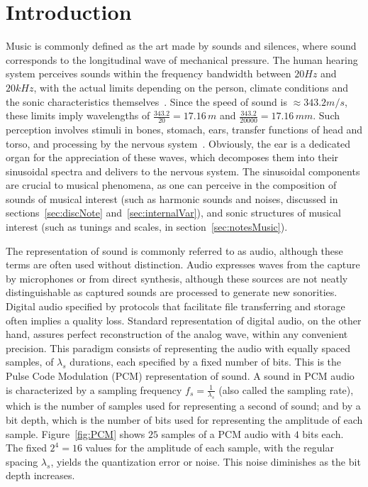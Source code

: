 \section{Introduction}\label{sec:level1}

Music is commonly defined as the art made by sounds and silences, where sound corresponds to the longitudinal wave of mechanical pressure. The human hearing system perceives sounds within the frequency bandwidth between $20Hz$ and $20kHz$, with the actual limits depending on the person, climate conditions and the sonic characteristics themselves~\cite{Roederer}. Since the speed of sound is $\approx 343.2 m/s$, these limits imply wavelengths of $\frac{343.2}{20} = 17.16\,m$ and $\frac{343.2}{20000}=17.16\,mm$. Such perception involves stimuli in bones, stomach, ears, transfer functions of head and torso, and processing by the nervous system~\cite{Roederer}. Obviously, the ear is a dedicated organ for the appreciation of these waves, which decomposes them into their sinusoidal spectra and delivers to the nervous system. The sinusoidal components are crucial to musical phenomena, as one can perceive in the composition of sounds of musical interest (such as harmonic sounds and noises, discussed in sections~\ref{sec:discNote} and~\ref{sec:internalVar}), and sonic structures of musical interest (such as tunings and scales, in section~\ref{sec:notesMusic}). 

The representation of sound is commonly referred to as audio, although these terms are often used without distinction. Audio expresses waves from the capture by microphones or from direct synthesis, although these sources are not neatly distinguishable as captured sounds are processed to generate new sonorities. Digital audio specified by protocols that facilitate file transferring and storage often implies a quality loss. Standard representation of digital audio, on the other hand, assures perfect reconstruction of the analog wave, within any convenient precision. This paradigm consists of representing the audio with equally spaced samples, of $\lambda_s$ durations, each specified by a fixed number of bits. This is the Pulse Code Modulation (PCM) representation of sound. A sound in PCM audio is characterized by a sampling frequency $f_s=\frac{1}{\lambda_s}$ (also called the sampling rate), which is the number of samples used for representing a second of sound; and by a bit depth, which is the number of bits used for representing the amplitude of each sample. Figure~\ref{fig:PCM} shows $25$ samples of a PCM audio with $4$ bits each. The fixed $2^4=16$ values for the amplitude of each sample, with the regular spacing $\lambda_s$, yields the quantization error or noise. This noise diminishes as the bit depth increases.

